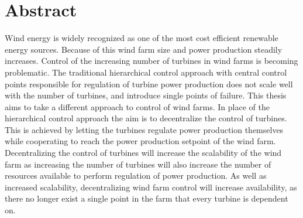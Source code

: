 \chapter{Abstract}
Wind energy is widely recognized as one of the most cost efficient renewable energy sources. 
Because of this wind farm size and power production steadily increases.
Control of the increasing number of turbines in wind farms is becoming problematic.
%
The traditional hierarchical control approach with central control points responsible for regulation of turbine power production does not scale well with the number of turbines, and introduce single points of failure.
%
This thesis aims to take a different approach to control of wind farms.
%
In place of the hierarchical control approach the aim is to decentralize the control of turbines.
%
This is achieved by letting the turbines regulate power production themselves while cooperating to reach the power production setpoint of the wind farm.
Decentralizing the control of turbines will increase the scalability of the wind farm as increasing the number of turbines will also increase the number of resources available to perform regulation of power production.
%
As well as increased scalability, decentralizing wind farm control will increase availability, as there no longer exist a single point in the farm that every turbine is dependent on.

